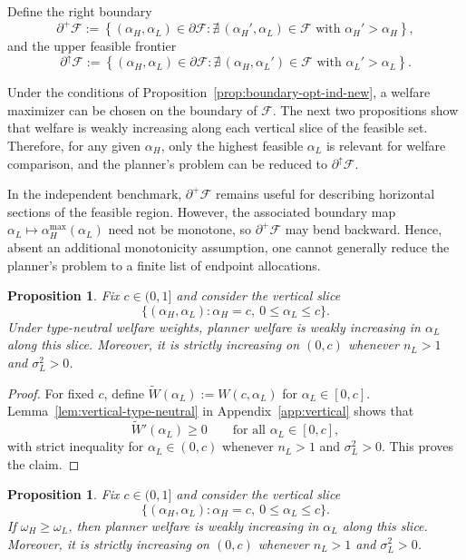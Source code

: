 \documentclass[a4paper,12pt]{article}
\newtheorem{proposition}[theorem]{Proposition}
\theoremstyle{definition}
\theoremstyle{remark}
\newcommand{\1}{\mathbf{1}}
\begin{document}
Define the right boundary
\[
\partial^+\mathcal F
:=
\left\{(\alpha_H,\alpha_L)\in\partial\mathcal F:
\nexists\,(\alpha_H',\alpha_L)\in\mathcal F
\text{ with }\alpha_H'>\alpha_H
\right\},
\]
and the upper feasible frontier
\[
\partial^\uparrow\mathcal F
:=
\left\{(\alpha_H,\alpha_L)\in\partial\mathcal F:
\nexists\,(\alpha_H,\alpha_L')\in\mathcal F
\text{ with }\alpha_L'>\alpha_L
\right\}.
\]

Under the conditions of Proposition~\ref{prop:boundary-opt-ind-new}, a welfare maximizer can be chosen
on the boundary of \(\mathcal F\). The next two propositions show that welfare
is weakly increasing along each vertical slice of the feasible set. Therefore,
for any given \(\alpha_H\), only the highest feasible \(\alpha_L\) is relevant
for welfare comparison, and the planner's problem can be reduced to
\(\partial^\uparrow\mathcal F\).

In the independent benchmark, \(\partial^+\mathcal F\) remains useful for
describing horizontal sections of the feasible region. However, the associated
boundary map \(\alpha_L\mapsto\alpha_H^{\max}(\alpha_L)\) need not be monotone,
so \(\partial^+\mathcal F\) may bend backward. Hence, absent an additional
monotonicity assumption, one cannot generally reduce the planner's problem to a
finite list of endpoint allocations.

\begin{proposition}\label{prop:vert-monotone-new}
Fix \(c\in(0,1]\) and consider the vertical slice
\[
\{(\alpha_H,\alpha_L): \alpha_H=c,\ 0\le \alpha_L\le c\}.
\]
Under type-neutral welfare weights, planner welfare is weakly increasing in
\(\alpha_L\) along this slice. Moreover, it is strictly increasing on \((0,c)\)
whenever \(n_L>1\) and \(\sigma_L^2>0\).
\end{proposition}

\begin{proof}
For fixed \(c\), define \(\widetilde W(\alpha_L):=W(c,\alpha_L)\) for
\(\alpha_L\in[0,c]\). Lemma~\ref{lem:vertical-type-neutral} in
Appendix~\ref{app:vertical} shows that
\[
\widetilde W'(\alpha_L)\ge 0
\qquad\text{for all }\alpha_L\in[0,c],
\]
with strict inequality for \(\alpha_L\in(0,c)\) whenever \(n_L>1\) and
\(\sigma_L^2>0\). This proves the claim.
\end{proof}

\begin{proposition}\label{prop:vert-monotone-general-omega}
Fix \(c\in(0,1]\) and consider the vertical slice
\[
\{(\alpha_H,\alpha_L): \alpha_H=c,\ 0\le \alpha_L\le c\}.
\]
If \(\omega_H\ge \omega_L\), then planner welfare is weakly increasing in
\(\alpha_L\) along this slice. Moreover, it is strictly increasing on \((0,c)\)
whenever \(n_L>1\) and \(\sigma_L^2>0\).
\end{proposition}
\end{document}
